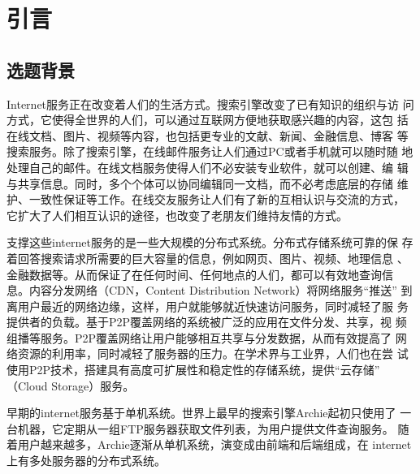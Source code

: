 \chapter{引言}
\label{chap:intro}

\section{选题背景}




Internet服务正在改变着人们的生活方式。搜索引擎改变了已有知识的组织与访
问方式，它使得全世界的人们，可以通过互联网方便地获取感兴趣的内容，这包
括在线文档、图片、视频等内容，也包括更专业的文献、新闻、金融信息、博客
等搜索服务。除了搜索引擎，在线邮件服务让人们通过PC或者手机就可以随时随
地处理自己的邮件。在线文档服务使得人们不必安装专业软件，就可以创建、编
辑与共享信息。同时，多个个体可以协同编辑同一文档，而不必考虑底层的存储
维护、一致性保证等工作。在线交友服务让人们有了新的互相认识与交流的方式，
它扩大了人们相互认识的途径，也改变了老朋友们维持友情的方式。


支撑这些internet服务的是一些大规模的分布式系统。分布式存储系统可靠的保
存着回答搜索请求所需要的巨大容量的信息，例如网页、图片、视频、地理信息
、金融数据等。从而保证了在任何时间、任何地点的人们，都可以有效地查询信
息。内容分发网络（CDN，Content Distribution Network）将网络服务“推送”
到离用户最近的网络边缘，这样，用户就能够就近快速访问服务，同时减轻了服
务提供者的负载。基于P2P覆盖网络的系统被广泛的应用在文件分发、共享，视
频组播等服务。P2P覆盖网络让用户能够相互共享与分发数据，从而有效提高了
网络资源的利用率，同时减轻了服务器的压力。在学术界与工业界，人们也在尝
试使用P2P技术，搭建具有高度可扩展性和稳定性的存储系统，提供“云存储”
（Cloud Storage）服务。

早期的internet服务基于单机系统。世界上最早的搜索引擎Archie起初只使用了
一台机器，它定期从一组FTP服务器获取文件列表，为用户提供文件查询服务。
随着用户越来越多，Archie逐渐从单机系统，演变成由前端和后端组成，在
internet上有多处服务器的分布式系统。

